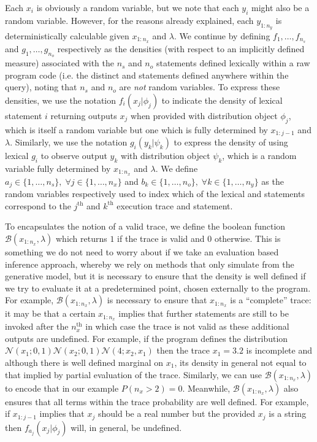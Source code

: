 Each $x_{i}$ is obviously a random variable, but we note that each $y_i$ might also be a random variable.  However,
for the reasons already explained, each $y_{1:n_y}$ is deterministically calculable given 
$x_{1:n_x}$ and $\lambda$.
We continue by defining $f_{1},\dots,f_{n_s}$ and $g_{1},\dots,g_{n_o}$ respectively as the densities (with respect to
an implicitly defined measure) associated with the $n_s$ \sample 
and $n_o$ \observe statements defined lexically within a raw program code (i.e. the distinct \sample and \observe
statements defined anywhere within the query), noting that $n_s$ and $n_o$ are \emph{not} random variables.
To express these densities, we use the notation $f_i(x_j|\phi_j)$ 
to indicate the density of lexical \sample statement $i$ returning outputs $x_j$ when provided
with distribution object $\phi_j$, which is itself a random variable but one which is fully determined by
$x_{1:j-1}$ and $\lambda$.  Similarly, we use the notation $g_i(y_k|\psi_k)$ to express the density of
using lexical \observe $g_i$ to observe output $y_k$ with distribution object $\psi_k$, which is a random
variable fully determined by $x_{1:n_x}$ and $\lambda$.  We define $a_j \in \{1,\dots,n_s\}, \; 
\forall j\in\{1,\dots,n_x\}$ and $b_k \in \{1,\dots,n_o\}, \; \forall k\in\{1,\dots,n_y\}$ as the
random variables respectively used to index which of the lexical \sample and \observe statements
correspond to the $j^{\text{th}}$ and $k^{\text{th}}$ execution trace \sample and \observe statement.

To encapsulates the notion of a valid trace, we define the boolean function $\mathcal{B}(x_{1:n_x},\lambda)$
which returns $1$ if the trace is valid and $0$ otherwise.   This is something we do not need
to worry about if we take an evaluation based inference approach, whereby
we rely on methods that only simulate from the generative model, but it is necessary to ensure that the density
is well defined if we try to evaluate it at a predetermined point, chosen externally to the program.
For example, $\mathcal{B}(x_{1:n_x},\lambda)$ is necessary to
ensure that $x_{1:n_x}$ is a ``complete'' trace: it may be that a certain $x_{1:n_x}$
implies that further \sample statements are still to be invoked after the $n_x^{\text{th}}$ in which case the
trace is not valid as these additional outputs are undefined.  For example, if the program defines the distribution
$\mathcal{N}(x_1;0,1)\mathcal{N}(x_2;0,1)\mathcal{N}(4;x_2,x_1)$ then the trace $x_1=3.2$ is incomplete
and although there is well defined marginal on $x_1$, its density in general not equal to that implied by
partial evaluation of the trace.  
Similarly, we can use  $\mathcal{B}(x_{1:n_x},\lambda)$ to encode that in our example $P(n_x>2)=0$.  Meanwhile,
$\mathcal{B}(x_{1:n_x},\lambda)$ also ensures that  all terms within the
trace probability are well defined.  For example, if $x_{1:j-1}$ implies that $x_j$ should be a real number but the provided
$x_j$ is a string then $f_{a_j} (x_j | \phi_j)$ will, in general, be undefined. 

